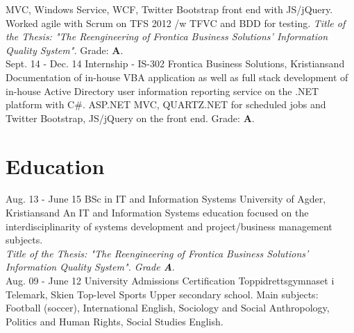 \documentclass[]{cv-class}
\begin{document}
\begin{entrylist}
{    MVC, Windows Service, WCF,
    Twitter Bootstrap front end with JS/jQuery. Worked agile with Scrum on TFS 2012 /w TFVC
    and BDD for testing.
    \emph{Title of the Thesis:
    "The Reengineering of Frontica Business Solutions' Information Quality System".}
    Grade: \textbf{A}.\\}
  \entry
    {Sept. 14 - Dec. 14}
    {Internship - IS-302}
    {Frontica Business Solutions, Kristiansand}
    {Documentation of in-house VBA application as well as full stack development of
    in-house Active Directory
    user information reporting service on the .NET platform with C\#. ASP.NET MVC,
    QUARTZ.NET for scheduled jobs
    and Twitter Bootstrap, JS/jQuery on the front end. Grade: \textbf{A}.\\}
\end{entrylist}


\newpage
\section{Education}
\begin{entrylist}
  \entry
    {Aug. 13 - June 15}
    {BSc in IT and Information Systems}
    {University of Agder, Kristiansand}
    {An IT and Information Systems education focused on the interdisciplinarity of
    systems development and project/business management subjects.\\
    \emph{Title of the Thesis: "The Reengineering of Frontica Business Solutions'
    Information Quality System". Grade \textbf{A}}.\\}
  \entry
    {Aug. 09 - June 12}
    {University Admissions Certification}
    {Toppidrettsgymnaset i Telemark, Skien}
    {Top-level Sports Upper secondary school.
    Main subjects: Football (soccer), International English, Sociology and Social Anthropology,
    Politics and Human Rights, Social Studies English.}
\end{entrylist}
\end{document}
